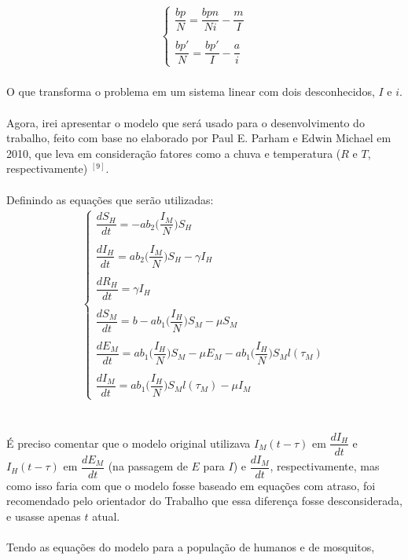 \documentclass[12pt]{article}
\begin{document}
\begin{gather*}
\begin{cases}
\dfrac{bp}{N} = \dfrac{bpn}{Ni} -\dfrac{m}{I} \\
\\
\dfrac{bp'}{N} = \dfrac{bp'}{I} -\dfrac{a}{i} 
\end{cases}
\end{gather*}
\\
O que transforma o problema em um sistema linear com dois desconhecidos, 
$I$ e $i$.
\\\\
Agora, irei apresentar o modelo que será usado para o desenvolvimento do 
trabalho, feito com base no elaborado por Paul E. Parham e Edwin Michael 
em 2010, que leva em consideração fatores como a chuva e temperatura 
($R$ e $T$, respectivamente) $^{[9]}$. 
\\\\
Definindo as equações que serão utilizadas:
\begin{gather*}
\begin{cases}
\dfrac{dS_H}{dt} = -ab_2\bigg(\dfrac{I_M}{N}\bigg)S_H\\
\\
\dfrac{dI_H}{dt} = ab_2\bigg(\dfrac{I_M}{N}\bigg)S_H-\gamma I_H\\
\\
\dfrac{dR_H}{dt} = \gamma I_H\\
\\
\dfrac{dS_M}{dt} = b - ab_1\bigg(\dfrac{I_H}{N}\bigg)S_M - \mu S_M\\
\\
\dfrac{dE_M}{dt} = ab_1\bigg(\dfrac{I_H}{N}\bigg)S_M - \mu E_M - ab_1\bigg(\dfrac{I_H}{N}\bigg)S_Ml(\tau_M)\\
\\
\dfrac{dI_M}{dt} = ab_1\bigg(\dfrac{I_H}{N}\bigg)S_Ml(\tau_M) -\mu I_M
\end{cases}
\end{gather*}
\\\\
É preciso comentar que o modelo original utilizava $I_M(t-\tau)$ em 
$\dfrac{dI_H}{dt}$ e $I_H(t-\tau)$ em $\dfrac{dE_M}{dt}$ (na passagem 
de $E$ para $I$) e $\dfrac{dI_M}{dt}$, respectivamente, mas como isso 
faria com que o modelo fosse baseado em equações com atraso, foi 
recomendado pelo orientador do Trabalho que essa diferença fosse 
desconsiderada, e usasse apenas $t$ atual.
\\\\
Tendo as equações do modelo para a população de humanos e de mosquitos, 
\end{document}
